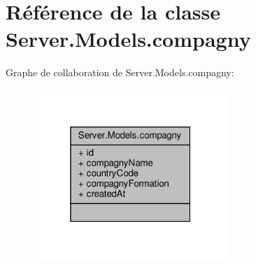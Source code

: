 \hypertarget{class_server_1_1_models_1_1compagny}{}\section{Référence de la classe Server.\+Models.\+compagny}
\label{class_server_1_1_models_1_1compagny}


Graphe de collaboration de Server.\+Models.\+compagny\+:\nopagebreak
\begin{figure}[H]
\begin{center}
\leavevmode
\includegraphics[width=208pt]{class_server_1_1_models_1_1compagny__coll__graph}
\end{center}
\end{figure}
